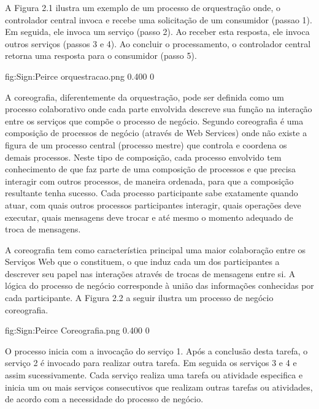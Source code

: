 A Figura 2.1 ilustra um exemplo de um processo de orquestração onde, o controlador central invoca e recebe uma solicitação de um consumidor (passao 1). Em seguida, ele invoca um serviço (passo 2). Ao receber esta resposta, ele invoca outros serviços (passos 3 e 4). Ao concluir o processamento, o controlador central retorna uma resposta para o consumidor (passo 5).    

       {fig:Sign:Peirce}
       {orquestracao.png}
       {0.400}
       {0}

A coreografia, diferentemente da orquestração, pode ser definida como um processo colaborativo onde cada parte envolvida descreve sua função na interação entre os serviços que compõe o processo de negócio. Segundo  \cite{Peltz} coreografia é uma composição de processos de negócio (através de Web Services) onde não existe a figura de um processo central (processo mestre) que controla e coordena os demais processos. Neste tipo de composição, cada processo envolvido tem conhecimento de que faz parte de uma composição de processos e que precisa interagir com outros processos, de maneira ordenada, para que a composição resultante tenha sucesso. Cada processo participante sabe exatamente quando atuar, com quais outros processos participantes interagir, quais operações deve executar, quais mensagens deve trocar e até mesmo o momento adequado de troca de mensagens. 

A coreografia tem como característica principal uma maior colaboração entre os Serviços Web que o constituem, o que induz cada um dos participantes a descrever seu papel nas interações através de trocas de mensagens entre si. A lógica do processo de negócio corresponde à união das informações conhecidas por cada participante. A Figura 2.2 a seguir ilustra um processo de negócio coreografia. 

       {fig:Sign:Peirce}
       {Coreografia.png}
       {0.400}
       {0}
       
O processo inicia com a invocação do serviço 1. Após a conclusão desta tarefa, o serviço 2 é invocado para realizar outra tarefa. Em seguida os serviços 3 e 4 e assim sucessivamente. Cada serviço realiza uma tarefa ou atividade especifica e inicia um ou mais serviços consecutivos que realizam outras tarefas ou atividades, de acordo com a necessidade do processo de negócio. 

